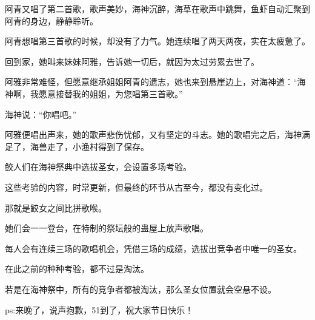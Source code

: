 \begin{this_body}
阿青又唱了第二首歌，歌声美妙，海神沉醉，海草在歌声中跳舞，鱼虾自动汇聚到阿青的身边，静静聆听。

阿青想唱第三首歌的时候，却没有了力气。她连续唱了两天两夜，实在太疲惫了。

回到家，她叫来妹妹阿雅，告诉她一切后，就因为太过劳累去世了。

阿雅非常难怪，但愿意继承姐姐阿青的遗志，她也来到悬崖边上，对海神道：“海神啊，我愿意接替我的姐姐，为您唱第三首歌。”

海神说：“你唱吧。”

阿雅便唱出声来，她的歌声悲伤忧郁，又有坚定的斗志。她的歌唱完之后，海神满足了，海兽走了，小渔村得到了保存。

鲛人们在海神祭典中选拔圣女，会设置多场考验。

这些考验的内容，时常更新，但最终的环节从古至今，都没有变化过。

那就是鲛女之间比拼歌喉。

她们会一一登台，在特制的祭坛般的蛊屋上放声歌唱。

每人会有连续三场的歌唱机会，凭借三场的成绩，选拔出竞争者中唯一的圣女。

在此之前的种种考验，都不过是淘汰。

若是在海神祭中，所有的竞争者都被淘汰，那么圣女位置就会空悬不设。

ps:来晚了，说声抱歉，51到了，祝大家节日快乐！

\end{this_body}

